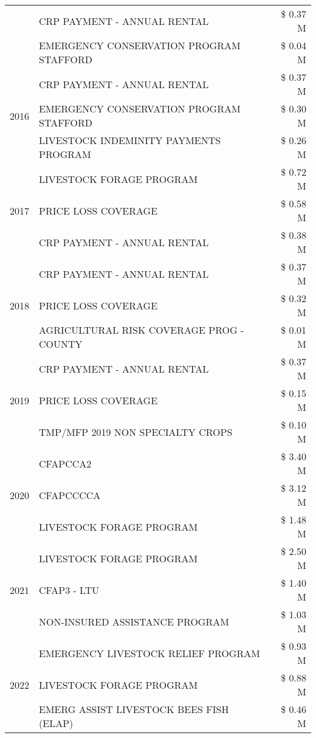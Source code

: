 \begin{tabular}{llr}
 & CRP PAYMENT - ANNUAL RENTAL & \$ 0.37 M \\
 & EMERGENCY CONSERVATION PROGRAM STAFFORD & \$ 0.04 M \\
\cline{1-3}
\multirow[t]{3}{*}{2016} & CRP PAYMENT - ANNUAL RENTAL & \$ 0.37 M \\
 & EMERGENCY CONSERVATION PROGRAM STAFFORD & \$ 0.30 M \\
 & LIVESTOCK INDEMINITY PAYMENTS PROGRAM & \$ 0.26 M \\
\cline{1-3}
\multirow[t]{3}{*}{2017} & LIVESTOCK FORAGE PROGRAM & \$ 0.72 M \\
 & PRICE LOSS COVERAGE & \$ 0.58 M \\
 & CRP PAYMENT - ANNUAL RENTAL & \$ 0.38 M \\
\cline{1-3}
\multirow[t]{3}{*}{2018} & CRP PAYMENT - ANNUAL RENTAL & \$ 0.37 M \\
 & PRICE LOSS COVERAGE & \$ 0.32 M \\
 & AGRICULTURAL RISK COVERAGE PROG - COUNTY & \$ 0.01 M \\
\cline{1-3}
\multirow[t]{3}{*}{2019} & CRP PAYMENT - ANNUAL RENTAL & \$ 0.37 M \\
 & PRICE LOSS COVERAGE & \$ 0.15 M \\
 & TMP/MFP 2019 NON SPECIALTY CROPS & \$ 0.10 M \\
\cline{1-3}
\multirow[t]{3}{*}{2020} & CFAPCCA2 & \$ 3.40 M \\
 & CFAPCCCCA & \$ 3.12 M \\
 & LIVESTOCK FORAGE PROGRAM & \$ 1.48 M \\
\cline{1-3}
\multirow[t]{3}{*}{2021} & LIVESTOCK FORAGE PROGRAM & \$ 2.50 M \\
 & CFAP3 - LTU & \$ 1.40 M \\
 & NON-INSURED ASSISTANCE PROGRAM & \$ 1.03 M \\
\cline{1-3}
\multirow[t]{3}{*}{2022} & EMERGENCY LIVESTOCK RELIEF PROGRAM & \$ 0.93 M \\
 & LIVESTOCK FORAGE PROGRAM & \$ 0.88 M \\
 & EMERG ASSIST LIVESTOCK BEES FISH (ELAP) & \$ 0.46 M \\
\cline{1-3}
\bottomrule
\end{tabular}
